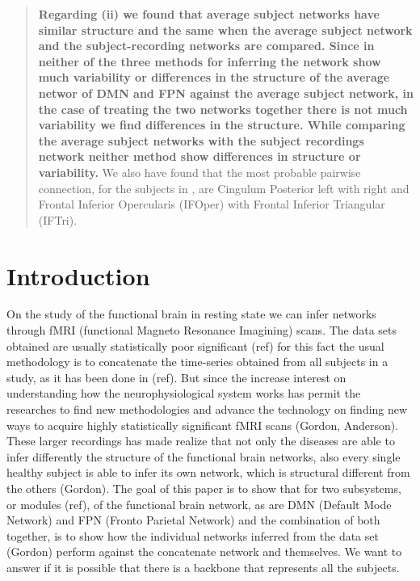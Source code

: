 \documentclass[a4paper,12pt]{article}
\begin{document}
\begin{abstract}
\textbf{Regarding (ii) we found that average subject networks have similar structure and the same when the average subject network and the subject-recording networks are compared. Since in neither of the three methods for inferring the network show much variability or differences in the structure of the average networ of DMN and FPN against the average subject network, in the case of treating the two networks together there is not much variability we find differences in the structure. While comparing the average subject networks with the subject recordings network neither method show differences in structure or variability.}
We also have found that the most probable pairwise connection, for the subjects in \cite{Gordon2017}, are Cingulum Posterior left with right and Frontal Inferior Opercularis (IFOper) with Frontal Inferior Triangular (IFTri).
\end{abstract}

\doublespacing

\section{Introduction}


On the study of the functional brain in resting state we can infer networks through fMRI (functional Magneto Resonance Imagining) scans. The data sets obtained are usually statistically poor significant (ref) for this fact the usual methodology is to concatenate the time-series obtained from all subjects in a study, as it has been done in (ref). But since the increase interest on understanding how the neurophysiological system works has permit the researches to find new methodologies and advance the technology on finding new ways to acquire highly statistically significant fMRI scans (Gordon, Anderson). These larger recordings has made realize that not only the diseases are able to infer differently the structure of the functional brain networks, also every single healthy subject is able to infer its own network, which is structural different from the others (Gordon). 
The goal of this paper is to show that for two subsystems, or modules (ref), of the functional brain network, as are DMN (Default Mode Network) and FPN (Fronto Parietal Network) and the combination of both together, is to show how the individual networks inferred from the data set (Gordon) perform against the concatenate network and themselves. We want to answer if it is possible that there is a backbone that represents all the subjects.
\end{document}
